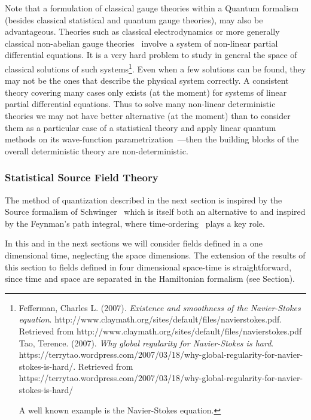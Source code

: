 \documentclass[11pt]{book}
\begin{document}
Note that a formulation of classical gauge theories within a Quantum
formalism (besides classical statistical and quantum gauge theories),
may also be advantageous. Theories such as classical electrodynamics or
more generally classical non-abelian gauge
theories~\cite{Actor1979Classical}
involve a system of non-linear partial differential equations. It is a
very hard problem to study in general the space of classical solutions
of such systems\footnote{Fefferman, Charles L. (2007). \emph{Existence
  and smoothness of the Navier-Stokes equation}.
  http://www.claymath.org/sites/default/files/navierstokes.pdf.
  Retrieved from
  http://www.claymath.org/sites/default/files/navierstokes.pdf Tao,
  Terence. (2007). \emph{Why global regularity for Navier-Stokes is
  hard}.
  https://terrytao.wordpress.com/2007/03/18/why-global-regularity-for-navier-stokes-is-hard/.
  Retrieved from
  https://terrytao.wordpress.com/2007/03/18/why-global-regularity-for-navier-stokes-is-hard/

  A well known example is the Navier-Stokes equation.}. Even when a few
solutions can be found, they may not be the ones that describe the
physical system correctly. A consistent theory covering many cases only
exists (at the moment) for systems of linear partial differential
equations\cite{Ciarlet2013Linear}.
Thus to solve many non-linear deterministic theories we may not have
better alternative (at the moment) than to consider them as a particular
case of a statistical theory and apply linear quantum methods on its
wave-function
parametrization~\cite{Sudarshan1976Interaction}\cite{Manton2015primer}---then the building blocks of the overall deterministic theory
are non-deterministic.

\hypertarget{statistical-source-field-theory}{%
\subsubsection{Statistical Source Field
Theory}\label{statistical-source-field-theory}}

The method of quantization described in the next section is inspired by
the Source formalism of
Schwinger~\cite{Schwinger1989Particles} which is itself both an alternative to and inspired by the
Feynman's path integral, where
time-ordering~\cite{Gill2017feynman}\cite{Johnson2015Feynmanux2019s} plays a key role.

In this and in the next sections we will consider fields defined in a
one dimensional time, neglecting the space dimensions. The extension of
the results of this section to fields defined in four dimensional
space-time is straightforward, since time and space are separated in the
Hamiltonian formalism (see Section).
\end{document}
